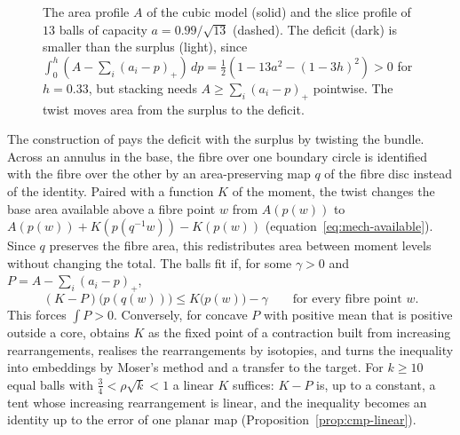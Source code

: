\begin{figure}[ht]
\centering
{}
\caption{The area profile $A$ of the cubic model (solid) and the slice profile of $13$ balls of capacity
$a=0.99/\sqrt{13}$ (dashed). The deficit (dark) is smaller than the surplus (light), since
$\int_0^h(A-\sum_i(a_i-p)_+)\,dp=\frac12(1-13a^2-(1-3h)^2)>0$ for $h=0.33$, but stacking needs $A\ge\sum_i(a_i-p)_+$
pointwise. The twist moves area from the surplus to the deficit.}
\label{fig:intro-profile}
\end{figure}

The construction of \cite{OpenAI2026} pays the deficit with the surplus by twisting the bundle. Across an
annulus in the base, the fibre over one boundary circle is identified with the fibre over the other by an
area-preserving map $q$ of the fibre disc instead of the identity. Paired with a function $K$ of the moment, the
twist changes the base area available above a fibre point $w$ from $A(p(w))$ to
$A(p(w))+K(p(q^{-1}w))-K(p(w))$ (equation~\eqref{eq:mech-available}). Since $q$ preserves the fibre area, this
redistributes area between moment levels without changing the total. The balls fit if, for some $\gamma>0$ and
$P=A-\sum_i(a_i-p)_+$,
\[
 (K-P)\bigl(p(q(w))\bigr)\le K\bigl(p(w)\bigr)-\gamma\qquad\text{for every fibre point }w.
\]
This forces $\int P>0$. Conversely, for concave $P$ with positive mean that is positive outside a core,
\cite{OpenAI2026} obtains $K$ as the fixed point of a contraction built from increasing rearrangements, realises the
rearrangements by isotopies, and turns the inequality into embeddings by Moser's method and a transfer to the target.
For $k\ge10$ equal balls with $\frac34<\rho\sqrt k<1$ a linear $K$ suffices: $K-P$ is, up
to a constant, a tent whose increasing rearrangement is linear, and the inequality becomes an identity up to the error
of one planar map (Proposition~\ref{prop:cmp-linear}).


